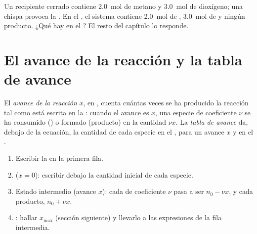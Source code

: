 \begin{example}\label{ex:g10:reaction-progress-table:methane}
Un recipiente cerrado contiene \qty{2.0}{mol} de metano y \qty{3.0}{mol}
de dioxígeno; una chispa provoca la 
. En el , el sistema contiene
\qty{2.0}{mol} de , \qty{3.0}{mol} de  y ningún
producto. ¿Qué hay en el ? El resto del capítulo lo
responde.
\end{example}

\section{El avance de la reacción y la tabla de avance}

\begin{definition}\label{def:g10:reaction-progress-table:extent}
El \emph{avance de la reacción} $x$, en
, cuenta cuántas veces se ha producido la reacción tal como está
escrita en la : cuando el avance es $x$, una especie de
coeficiente $\nu$ se ha consumido () o formado (producto) en la
cantidad $\nu x$. La \emph{tabla de avance} da,
debajo de la ecuación, la cantidad de cada especie en el , para un avance $x$ y en el .
\end{definition}

\begin{method}\label{met:g10:reaction-progress-table:fill}
\begin{enumerate}
  \item Escribir la  en la primera fila.
  \item {} ($x = 0$): escribir debajo la cantidad inicial de
        cada especie.
  \item Estado intermedio (avance $x$): cada  de coeficiente
        $\nu$ pasa a ser $n_0 - \nu x$, y cada producto, $n_0 + \nu x$.
  \item {}: hallar $x_{\max}$ (sección siguiente) y llevarlo a
        las expresiones de la fila intermedia.
\end{enumerate}
\end{method}

